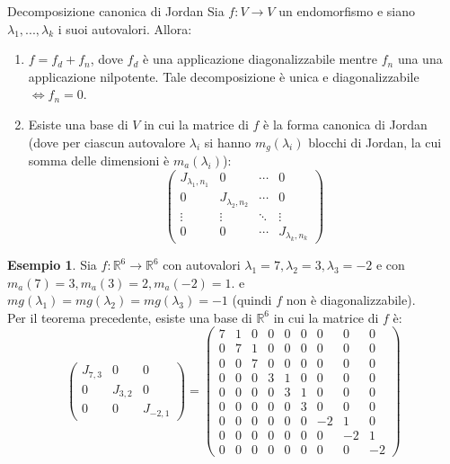 \documentclass[a4paper]{article}
\theoremstyle{definition}
\newtheorem*{es}{Esempio}
\begin{document}
	\begin{teo}{Decomposizione canonica di Jordan}{}
		Sia $f: V \to V$ un endomorfismo e siano $\lambda_1, ..., \lambda_k$ i suoi autovalori. Allora:
		\begin{enumerate}
			\item $f = f_d + f_n$, dove $f_d$ è una applicazione diagonalizzabile mentre $f_n$ una una applicazione nilpotente.
			Tale decomposizione è unica e diagonalizzabile $\Leftrightarrow f_n = 0$.
			\item Esiste una base di $V$ in cui la matrice di $f$ è la forma canonica di Jordan
			(dove per ciascun autovalore $\lambda_i$ si hanno $m_g(\lambda_i)$ blocchi di Jordan, la cui somma delle dimensioni è $m_a(\lambda_i)$):
			\begin{equation*}
				\begin{pmatrix}
					J_{\lambda_1, n_1} & 0 & \cdots & 0 \\
					0 & J_{\lambda_2, n_2} & \cdots & 0 \\
					\vdots & \vdots & \ddots & \vdots \\
					0 & 0 & \cdots & J_{\lambda_k, n_k}
				\end{pmatrix}
			\end{equation*}
		\end{enumerate}
	\end{teo}

	\begin{es}
		Sia $f: \mathbb{R}^6 \to \mathbb{R}^6$ con autovalori $\lambda_1 = 7, \lambda_2 = 3, \lambda_3 = -2$ e con
		$m_a(7) = 3, m_a(3) = 2, m_a(-2) = 1$. e $mg(\lambda_1) = mg(\lambda_2) = mg(\lambda_3) = -1$ (quindi $f$ non è diagonalizzabile). \\
		Per il teorema precedente, esiste una base di $\mathbb{R}^6$ in cui la matrice di $f$ è:
		\begin{equation*}
			\begin{pmatrix}
				J_{7,3} & 0 & 0 \\
				0 & J_{3,2} & 0 \\
				0 & 0 & J_{-2,1}
			\end{pmatrix} = \left(
			\begin{array}{ccc|ccc|ccc}
			7 & 1 & 0 & 0 & 0 & 0 & 0 & 0 & 0 \\
			0 & 7 & 1 & 0 & 0 & 0 & 0 & 0 & 0 \\
			0 & 0 & 7 & 0 & 0 & 0 & 0 & 0 & 0 \\
			\hline
			0 & 0 & 0 & 3 & 1 & 0 & 0 & 0 & 0 \\
			0 & 0 & 0 & 0 & 3 & 1 & 0 & 0 & 0 \\
			0 & 0 & 0 & 0 & 0 & 3 & 0 & 0 & 0 \\
			\hline
			0 & 0 & 0 & 0 & 0 & 0 & -2 & 1 & 0 \\
			0 & 0 & 0 & 0 & 0 & 0 & 0 & -2 & 1 \\
			0 & 0 & 0 & 0 & 0 & 0 & 0 & 0 & -2
			\end{array}
			\right)
		\end{equation*}
	\end{es}
\end{document}

